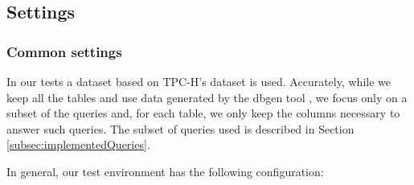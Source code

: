 \documentclass[sigplan,10pt]{acmart}
\begin{document}

\subsection{Settings}

\subsubsection{Common settings}
\label{subsubsec:commonSettings}

In our tests a dataset based on TPC-H's dataset \cite{tpch} is used.
Accurately, while we keep all the tables and use data generated by the dbgen tool \cite{tpch}, we focus only on a subset of the queries and, for each table, we only keep the columns necessary to answer such queries.
The subset of queries used is described in Section \ref{subsec:implementedQueries}.


In general, our test environment has the following configuration:
\end{document}
